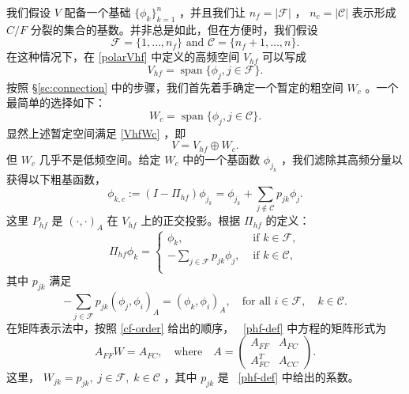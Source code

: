 \documentclass[12pt]{acta_2011xz}
\newcommand{\Span}{\ensuremath{\operatorname{span}}}
\begin{document}
我们假设    $V$    配备一个基础    $ \{ \phi_k \} _{k=1}^n$    ，并且我们让    $n_f=|\mathcal F|$    ，    $n_c=|\mathcal C|$    表示形成    $C/F$    分裂的集合的基数。并非总是如此，但在方便时，我们假设 
   \begin{equation}\label{cf-order}
    \mathcal F= \{ 1,\ldots,n_f \}  \text{ and } \mathcal C= \{ n_f+1,\ldots,n \} .  
\end{equation}    在这种情况下，在
   \eqref{polarVhf}    中定义的高频空间    $V_{hf}$    可以写成
   \begin{equation}\label{Vhf}
V_{hf}=\operatorname{span} \{ \phi_j, j\in \mathcal F \} .
\end{equation}    按照    \S       \ref{sc:connection}    中的步骤，我们首先着手确定一个暂定的粗空间    $W_c$    。一个最简单的选择如下：
   \begin{equation}
  \label{classicalWc}
W_c=\Span  \{ \phi_j, j\in \mathcal C \} .
\end{equation}    显然上述暂定空间满足    \eqref{VhfWc}    ，即
   $$
V=V_{hf}\oplus W_c. 
$$    但    $W_c$    几乎不是低频空间。给定    $W_c$    中的一个基函数    $\phi_{j_k}$    ，我们滤除其高频分量以获得以下粗基函数，
   \begin{equation}
\label{phiHh}
\phi_{k,c}:= (I-\Pi_{hf})\phi_{j_k} = \phi_{j_k} + \sum_{j\notin \mathcal C} p_{jk} \phi_j.  
\end{equation}    这里    $P_{hf}$    是    $(\cdot, \cdot)_A$    在
   $V_{hf}$    上的正交投影。根据    $\Pi_{hf}$    的定义：
   $$
\Pi_{hf}\phi_k= \begin{cases} \phi_k, &\text{ if } k\in \mathcal F, \\ 
-\sum\limits_{j\in \mathcal F}p_{jk}\phi_j, &\text{ if } k\in \mathcal C, \\ 
\end{cases}
$$    其中    $p_{jk}$    满足
   \begin{equation}\label{phf-def}
-\sum\limits_{j\in \mathcal F}p_{jk}(\phi_j, \phi_i)_A = (\phi_k, \phi_i)_A,
\quad \mbox{for all } i\in \mathcal F,\quad k\in \mathcal C.
\end{equation}    在矩阵表示法中，按照    \eqref{cf-order}    给出的顺序，~    \eqref{phf-def}    中方程的矩阵形式为
   \begin{equation}\label{e:harmonic}
A_{FF} W = A_{FC}, \quad \mbox{where}\quad A = 
\begin{pmatrix}
A_{FF} & A_{FC} \\ 
A_{FC}^T & A_{CC}
\end{pmatrix}. 
\end{equation}    这里，   $W_{jk} = p_{jk},\; j\in \mathcal F, \; k\in \mathcal C$    ，其中    $p_{jk}$    是~    \eqref{phf-def}    中给出的系数。  
\end{document}
